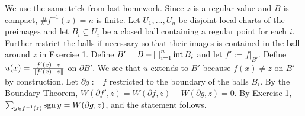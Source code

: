 \documentclass[12pt]{article}
\begin{document}
\begin{problem}[3.6.2]
	We use the same trick from last homework. Since $ z$ is a regular value and  $ B$ is compact,  $ \# f^{-1}(z) = n$ is finite. Let $ U_1,\ldots,U_n$ be disjoint local charts of the preimages and let $ B_i \subseteq U_i$ be a closed ball containing a regular point for each $ i$. Further restrict the balls if necessary so that their images is contained in the ball around $ z$ in Exercise 1. Define  $ B' = B - \bigsqcup_{ i=1}^{n} \operatorname{int} B_i$ and let $ f':=f|_{B'}$. Define $ u(x)=\frac{f'(x)-z}{{\left\lVert{ f'(x)-z}\right\rVert}  }$ on $ \partial B'$. We see that $u$ extends to $ B'$ because $ f(x) \neq z$ on  $ B'$ by construction. Let $ \partial g:= f$ restricted to the boundary of the balls $ B_i$. By the Boundary Theorem,  $ W(\partial f',z) = W(\partial f,z) - W(\partial g,z) = 0$. By Exercise 1, $ \sum_{y \in f^{-1}(z)} \operatorname{sgn} y = W(\partial g,z)$, and the statement follows.
\end{problem}
\end{document}
